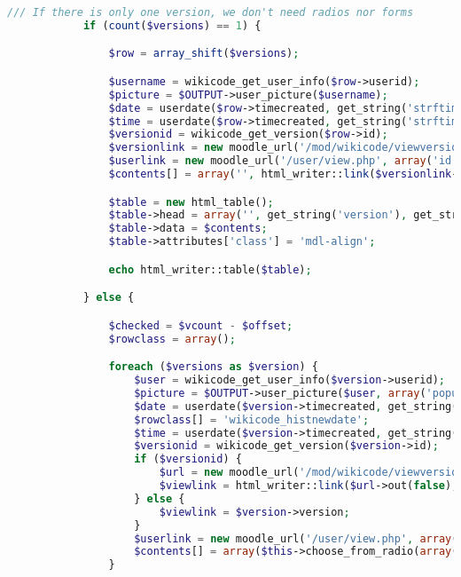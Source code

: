 \begin{lstlisting}[language=PHP]
            /// If there is only one version, we don't need radios nor forms
            if (count($versions) == 1) {

                $row = array_shift($versions);

                $username = wikicode_get_user_info($row->userid);
                $picture = $OUTPUT->user_picture($username);
                $date = userdate($row->timecreated, get_string('strftimedate', 'langconfig'));
                $time = userdate($row->timecreated, get_string('strftimetime', 'langconfig'));
                $versionid = wikicode_get_version($row->id);
                $versionlink = new moodle_url('/mod/wikicode/viewversion.php', array('pageid' => $pageid, 'versionid' => $versionid->id));
                $userlink = new moodle_url('/user/view.php', array('id' => $username->id));
                $contents[] = array('', html_writer::link($versionlink->out(false), $row->version), $picture . html_writer::link($userlink->out(false), fullname($username)), $time, $OUTPUT->container($date, 'wikicode_histdate'));

                $table = new html_table();
                $table->head = array('', get_string('version'), get_string('user'), get_string('modified'), '');
                $table->data = $contents;
                $table->attributes['class'] = 'mdl-align';

                echo html_writer::table($table);

            } else {

                $checked = $vcount - $offset;
                $rowclass = array();

                foreach ($versions as $version) {
                    $user = wikicode_get_user_info($version->userid);
                    $picture = $OUTPUT->user_picture($user, array('popup' => true));
                    $date = userdate($version->timecreated, get_string('strftimedate'));
                    $rowclass[] = 'wikicode_histnewdate';
                    $time = userdate($version->timecreated, get_string('strftimetime', 'langconfig'));
                    $versionid = wikicode_get_version($version->id);
                    if ($versionid) {
                        $url = new moodle_url('/mod/wikicode/viewversion.php', array('pageid' => $pageid, 'versionid' => $versionid->id));
                        $viewlink = html_writer::link($url->out(false), $version->version);
                    } else {
                        $viewlink = $version->version;
                    }
                    $userlink = new moodle_url('/user/view.php', array('id' => $version->userid));
                    $contents[] = array($this->choose_from_radio(array($version->version  => null), 'compare', 'M.mod_wikicode.history()', $checked - 1, true) . $this->choose_from_radio(array($version->version  => null), 'comparewith', 'M.mod_wikicode.history()', $checked, true), $viewlink, $picture . html_writer::link($userlink->out(false), fullname($user)), $time, $OUTPUT->container($date, 'wikicode_histdate'));
                }


\end{lstlisting}
